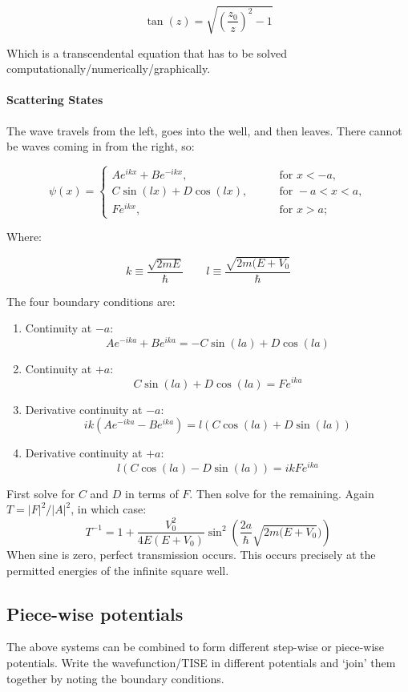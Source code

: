 \documentclass[12pt]{article}
\begin{document}
\[\boxed{\tan{(z)} = \sqrt{\left(\frac{z_0}{z}\right)^2 - 1}}\]

Which is a transcendental equation that has to be solved computationally/numerically/graphically.

\paragraph{Scattering States}

The wave travels from the left, goes into the well, and then leaves. There cannot be waves coming in from the right, so:

\[
\psi(x) = 
\left.
\begin{cases}
Ae^{ikx} + Be^{-ikx}, &\qquad \text{for } x < -a,\\
C\sin{(lx)} + D\cos{(lx)}, &\qquad \text{for } -a < x < a,\\
Fe^{ikx}, &\qquad \text{for } x > a;
\end{cases}
\right.
\]

Where:

\[ k \equiv \frac{\sqrt{2mE}}{\hbar} \qquad l \equiv \frac{\sqrt{2m(E+V_0}}{\hbar}\]

The four boundary conditions are:
\begin{enumerate}
    \item Continuity at $-a$: \[Ae^{-ika}+Be^{ika} = -C\sin{(la)} + D\cos{(la)}\]
    \item Continuity at $+a$:
    \[C\sin{(la)} + D\cos{(la)} = Fe^{ika}\]
    \item Derivative continuity at $-a$:
    \[ik(Ae^{-ika}-Be^{ika}) = l(C\cos{(la)} + D\sin{(la)})\]
    \item Derivative continuity at $+a$:
    \[l(C\cos{(la)} - D\sin{(la)}) = ikFe^{ika}\]
\end{enumerate}
First solve for $C$ and $D$ in terms of $F$. Then solve for the remaining. Again $T = |F|^2/|A|^2$, in which case:
\[T^{-1} = 1 + \frac{V_0^2}{4E(E+V_0)}\sin^2{\left(\frac{2a}{\hbar}\sqrt{2m(E+V_0})\right)}\]
When sine is zero, perfect transmission occurs. This occurs precisely at the permitted energies of the infinite square well.



\subsection{Piece-wise potentials}

The above systems can be combined to form different step-wise or piece-wise potentials. Write the wavefunction/TISE in different potentials and `join' them together by noting the boundary conditions.
\end{document}
